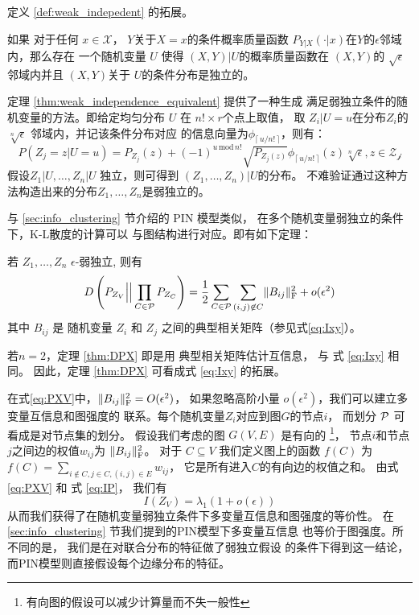 定义 \ref{def:weak_indepedent} 的拓展。
\begin{theorem}\label{thm:weak_independence_equivalent}
  如果 对于任何 $x \in \mathcal{X}$，
$Y$关于$X=x$的条件概率质量函数
$P_{Y|X}(\cdot |x)$在$Y$的$\epsilon$邻域内，那么存在
一个随机变量 $U$
  使得
  $(X, Y)|U$的概率质量函数在 $(X, Y)$的
  $\sqrt{\epsilon}$邻域内并且
  $(X, Y)$关于
  $U$的条件分布是独立的。
\end{theorem}
  定理 \ref{thm:weak_independence_equivalent} 提供了一种生成
  满足弱独立条件的随机变量的方法。即给定均匀分布
  $U$ 在 $n! \times r$个点上取值，
  取 $Z_i|U=u$在分布$Z_i$的
  $\sqrt[n]{\epsilon}$ 邻域内，并记该条件分布对应
  的信息向量为$\phi_{\lceil\, u/n!\, \rceil}$，则有：
  \begin{equation}
    P(Z_j=z|U=u) = P_{Z_j}(z) + 
    (-1)^{u \,\mathrm{mod}\, n!}\sqrt{P_{Z_j(z)}}
    \phi_{\lceil\, u/n!\, \rceil}(z) \sqrt[n]{\epsilon}, z \in \mathcal{Z_j}
  \end{equation}
  假设$Z_1|U, \dots, Z_n|U$ 独立，则可得到
  $(Z_1, \dots, Z_n)|U$的分布。
  不难验证通过这种方法构造出来的分布$Z_1, \dots, Z_n$是弱独立的。

与 \ref{sec:info_clustering} 节介绍的 PIN 模型类似，
在多个随机变量弱独立的条件下，K-L散度的计算可以
与图结构进行对应。即有如下定理：
\begin{theorem}\label{thm:DPX}
若 $Z_1, \dots, Z_n$ $\epsilon$-弱独立, 则有
\begin{equation}\label{eq:PXV}
D\left(P_{Z_V} \Big|\Big| \prod_{C\in \P} P_{Z_C} \right)
= {1 \over 2}
\sum_{C\in \P}\sum_{(i,j) \not\in C} \norm{B_{ij}}_{\mathrm{F}}^2 + o(\epsilon^2)
\end{equation}
其中 $B_{ij}$ 是 随机变量  $Z_i$ 和 $Z_j$
之间的典型相关矩阵（参见式\eqref{eq:Ixy}）。
\end{theorem}
若$ n = 2$，定理 \ref{thm:DPX} 即是用 典型相关矩阵估计互信息，
与 式 \eqref{eq:Ixy} 相同。
因此，定理 \ref{thm:DPX} 可看成式 \eqref{eq:Ixy} 
的拓展。

在式\eqref{eq:PXV}中，$\norm{B_{ij}}_{\mathrm{F}}^2 =O(\epsilon^2)$，
如果忽略高阶小量 $o(\epsilon^2)$，我们可以建立多变量互信息和图强度的
联系。每个随机变量$Z_i$对应到图$G$的节点$i$，
而划分 $\P$
可看成是对节点集的划分。
假设我们考虑的图 $G(V, E)$ 是有向的
\footnote{有向图的假设可以减少计算量而不失一般性}，
节点$i$和节点$j$之间边的权值$w_{ij}$为
$\norm{B_{ij}}_{\mathrm{F}}^2$。
对于 $C\subseteq V$
我们定义图上的函数 $f(C)$ 
 为 $f(C) = \sum_{i\not\in C, j\in C, (i,j) \in E} w_{ij}$，
它是所有进入$C$的有向边的权值之和。
由式\eqref{eq:PXV}
和 式 \eqref{eq:IP}，
我们有
\begin{equation}\label{eq:PXV_Data_Simplified}
I(Z_V) = \lambda_1 (1 + o(\epsilon))
\end{equation}
从而我们获得了在随机变量弱独立条件下多变量互信息和图强度的等价性。
在 \ref{sec:info_clustering} 节我们提到的PIN模型下多变量互信息
也等价于图强度。所不同的是，
我们是在对联合分布的特征做了弱独立假设
的条件下得到这一结论，而PIN模型则直接假设每个边缘分布的特征。


